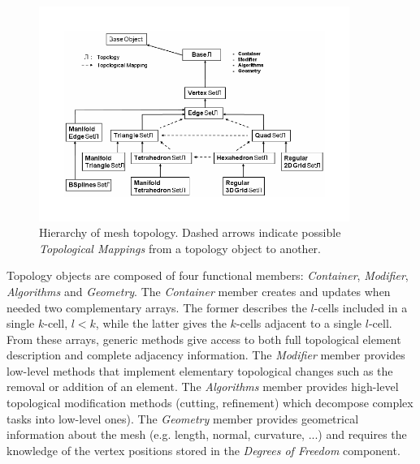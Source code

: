\begin{figure}[ht]
    \centering
        \includegraphics[width=0.9\textwidth]{BW_Topology_Family_Tree}
       \caption{Hierarchy of mesh topology. Dashed arrows indicate possible  \textit{Topological Mappings} from a topology object to another.}
    \label{fig:BW_Topology_Family_Tree}
\end{figure}


Topology objects are composed of four functional members:
 \textit{Container},  \textit{Modifier},  \textit{Algorithms} and  \textit{Geometry}.
The  \textit{Container} member creates and updates when needed two complementary arrays. The former describes the $l$-cells included in a single $k$-cell, $l<k$, while the latter gives the $k$-cells adjacent to a single $l$-cell.
From these arrays, generic methods give access to both full topological element description and complete adjacency information.
The  \textit{Modifier} member provides low-level methods that implement
elementary topological changes such as the removal or addition of an element. The  \textit{Algorithms} member provides high-level topological modification methods (cutting, refinement) which
decompose complex tasks into low-level
ones). 
The  \textit{Geometry} member provides geometrical information about the mesh (e.g. length, normal, curvature, ...) and requires the knowledge of the vertex positions stored in the  \textit{Degrees of Freedom} component. \\

